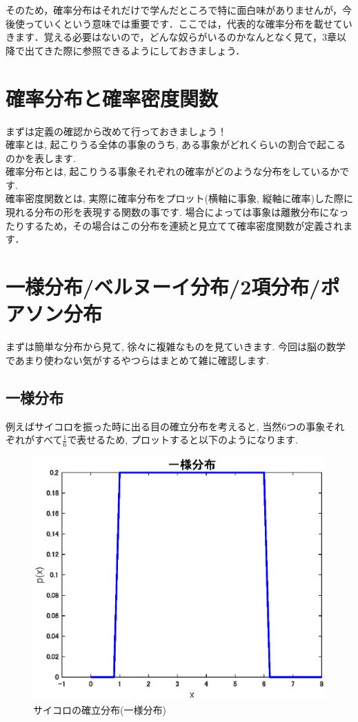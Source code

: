 \documentclass[11pt,a4paper]{ujreport} 	%
\begin{document}
そのため，確率分布はそれだけで学んだところで特に面白味がありませんが，今後使っていくという意味では重要です．ここでは，代表的な確率分布を載せていきます．覚える必要はないので，どんな奴らがいるのかなんとなく見て，3章以降で出てきた際に参照できるようにしておきましょう．
\section{確率分布と確率密度関数}
まずは定義の確認から改めて行っておきましょう！\\

確率とは, 起こりうる全体の事象のうち, ある事象がどれくらいの割合で起こるのかを表します. \\

確率分布とは, 起こりうる事象それぞれの確率がどのような分布をしているかです. \\

確率密度関数とは, 実際に確率分布をプロット(横軸に事象, 縦軸に確率)した際に現れる分布の形を表現する関数の事です. 場合によっては事象は離散分布になったりするため，その場合はこの分布を連続と見立てて確率密度関数が定義されます．\\

\section{一様分布/ベルヌーイ分布/2項分布/ポアソン分布}
まずは簡単な分布から見て, 徐々に複雑なものを見ていきます. 今回は脳の数学であまり使わない気がするやつらはまとめて雑に確認します.\\
\subsection{一様分布}
例えばサイコロを振った時に出る目の確立分布を考えると, 当然6つの事象それぞれがすべて$\frac{1}{6}$で表せるため, プロットすると以下のようになります.\\


\begin{figure}[H]
\label{im:uniform}
  \centering
  \includegraphics[width=15cm]{../figures/uniform.eps}
  \caption{サイコロの確立分布(一様分布)}
\end{figure}
\end{document}
